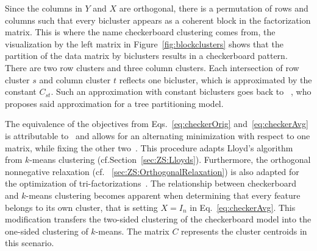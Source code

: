 Since the columns in $Y$ and $X$ are orthogonal, there is a permutation of rows and columns such that every bicluster appears as a coherent block in the factorization matrix. This is where the name checkerboard clustering comes from, the visualization by the left matrix in Figure~\ref{fig:blockclusters} shows that the partition of the data matrix by biclusters results in a checkerboard pattern. There are two row clusters and three column clusters. Each intersection of row cluster $s$ and column cluster $t$ reflects one bicluster, which is approximated by the constant $C_{st}$. Such an approximation with constant biclusters goes back to ~\cite{hartigan1972direct}, who proposes said approximation for a tree partitioning model.

The equivalence of the objectives from Eqs.~\eqref{eq:checkerOrig} and~\eqref{eq:checkerAvg} is attributable to~\cite{gaul1996new} and allows for an alternating minimization with respect to one matrix, while fixing the other two~\citep{maurizio2001double,wang2011fast,cho2004minimum}. This procedure adapts Lloyd's algorithm from $k$-means clustering (cf.\@ Section~\ref{sec:ZS:Lloyds}). Furthermore, the orthogonal nonnegative relaxation (cf. \@Section~\ref{sec:ZS:OrthogonalRelaxation}) is also adapted for the optimization of tri-factorizations~\citep{ding2006orthogonal, yoo2010orthogonal}. The relationship between checkerboard and $k$-means clustering becomes apparent when determining that every feature belongs to its own cluster, that is setting $X=I_n$ in Eq.~\eqref{eq:checkerAvg}. This modification transfers the two-sided clustering of the checkerboard model into the one-sided clustering of $k$-means. The matrix $C$ represents the cluster centroids in this scenario.
